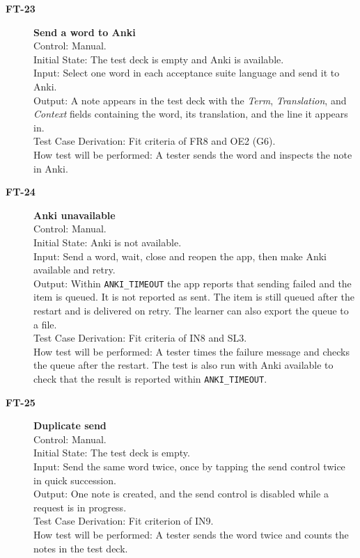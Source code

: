 \documentclass[12pt, titlepage]{article}
\newcommand{\tid}[1]{\hypertarget{test:#1}{\textbf{#1}}}
\newcommand{\cn}[1]{\texttt{#1}}
\begin{document}
\begin{description}

\item[\tid{FT-23}] \textbf{Send a word to Anki}\\
Control: Manual.\\
Initial State: The test deck is empty and Anki is available.\\
Input: Select one word in each acceptance suite language and send it to Anki.\\
Output: A note appears in the test deck with the \emph{Term}, \emph{Translation},
and \emph{Context} fields containing the word, its translation, and the line
it appears in.\\
Test Case Derivation: Fit criteria of FR8 and OE2 (G6).\\
How test will be performed: A tester sends the word and inspects the note in
Anki.

\item[\tid{FT-24}] \textbf{Anki unavailable}\\
Control: Manual.\\
Initial State: Anki is not available.\\
Input: Send a word, wait, close and reopen the app, then make Anki available and
retry.\\
Output: Within \cn{ANKI\_TIMEOUT} the app reports that sending failed and the
item is queued. It is not reported as sent. The item is still queued after the
restart and is delivered on retry. The learner can also export the queue to a
file.\\
Test Case Derivation: Fit criteria of IN8 and SL3.\\
How test will be performed: A tester times the failure message and checks the
queue after the restart. The test is also run with Anki available to check that
the result is reported within \cn{ANKI\_TIMEOUT}.

\item[\tid{FT-25}] \textbf{Duplicate send}\\
Control: Manual.\\
Initial State: The test deck is empty.\\
Input: Send the same word twice, once by tapping the send control twice in quick
succession.\\
Output: One note is created, and the send control is disabled while a request is
in progress.\\
Test Case Derivation: Fit criterion of IN9.\\
How test will be performed: A tester sends the word twice and counts the notes in
the test deck.


\end{description}
\end{document}
